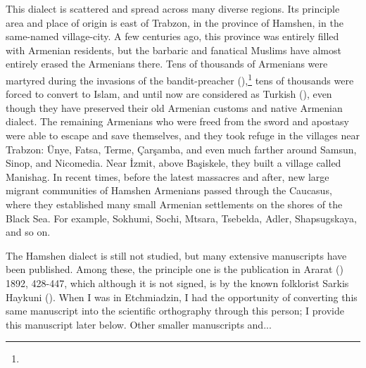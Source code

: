 This dialect is scattered and spread across many diverse regions. Its principle area and place of origin is east of Trabzon, in the province of Hamshen, in the same-named village-city. A few centuries ago, this province was entirely filled with Armenian residents, but the barbaric and fanatical Muslims have almost entirely erased the Armenians there. Tens of thousands of Armenians were martyred during the invasions of the bandit-preacher  (),\footnote{} tens of thousands were forced to convert to Islam, and until now are considered as Turkish (), even though they have preserved their old Armenian customs and native Armenian dialect. The remaining Armenians who were freed from the sword and apostasy were able to escape and save themselves, and they took refuge in the villages near Trabzon: Ünye, Fatsa, Terme, Çarşamba, and even much farther around Samsun, Sinop, and Nicomedia. Near İzmit, above Başiskele, they built a village called Manishag. In recent times, before the latest massacres and after, new large migrant communities of Hamshen Armenians passed through the Caucasus, where they established many small Armenian settlements on the shores of the Black Sea. For example, Sokhumi, Sochi, Mtsara, Tsebelda, Adler, Shapsugskaya, and so on. 


The Hamshen dialect is still not studied, but many extensive manuscripts have been published. Among these, the principle one is the publication in Ararat () 1892,  428-447, which although it is not signed, is by the known folklorist Sarkis Haykuni (). When I was in Etchmiadzin, I had the opportunity of converting this same manuscript into the scientific orthography through this person; I provide   this manuscript later below. Other smaller manuscripts and... 



